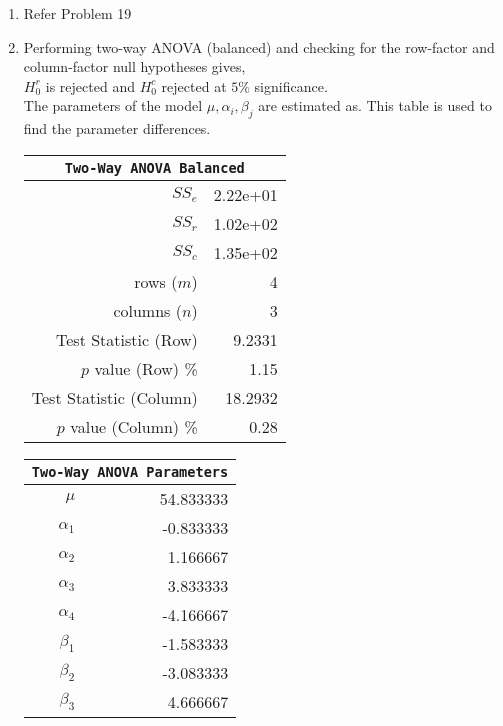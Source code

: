 \begin{enumerate}
	
	\item Refer Problem 19
	
	\item Performing two-way ANOVA (balanced) and checking for the row-factor and column-factor null hypotheses gives,\\
	$ H_0^r $ is rejected and $ H_0^c $ rejected at $ 5\% $ significance.\\
	
	The parameters of the model $ \mu, \alpha_i, \beta_j $ are estimated as. This table is used to find the parameter differences.\\
	
	
	\begin{table}[H]
		\centering
		\begin{minipage}{0.4\textwidth}
			\centering
			\begin{tabular}{@{}rr@{}}
				\toprule
				\multicolumn{2}{c}{\texttt{Two-Way ANOVA Balanced}} \\
				\midrule
				$SS_e$                  &               2.22e+01 \\
				$SS_r$                  &               1.02e+02 \\
				$SS_c$                  &               1.35e+02 \\
				rows ($m$)              &                      4 \\
				columns ($n$)           &                      3 \\
				Test Statistic (Row)    &                 9.2331 \\
				$p$ value (Row) \%      &                   1.15 \\
				Test Statistic (Column) &                18.2932 \\
				$p$ value (Column) \%   &                   0.28 \\
				\bottomrule
			\end{tabular}
		\end{minipage}
		\begin{minipage}{0.4\textwidth}
			\centering
			\begin{tabular}{@{}rr@{}}
				\toprule
				\multicolumn{2}{c}{\texttt{Two-Way ANOVA Parameters}} \\
				\midrule
				$\mu$      &                54.833333 \\
				$\alpha_1$ &                -0.833333 \\
				$\alpha_2$ &                 1.166667 \\
				$\alpha_3$ &                 3.833333 \\
				$\alpha_4$ &                -4.166667 \\
				$\beta_1$  &                -1.583333 \\
				$\beta_2$  &                -3.083333 \\
				$\beta_3$  &                 4.666667 \\
				\bottomrule
			\end{tabular}
		\end{minipage}
	\end{table}
	\bigskip
	

\end{enumerate}
